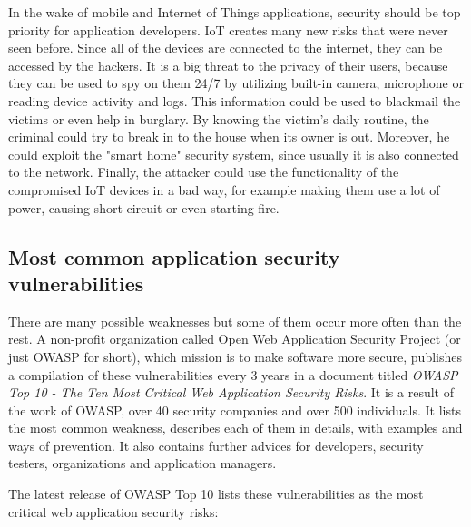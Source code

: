 \documentclass[a4paper]{article}
\begin{document}
In the wake of mobile and Internet of Things applications, security should be
top priority for application developers. IoT creates many new risks that were
never seen before. Since all of the devices are connected to the internet, they
can be accessed by the hackers. It is a big threat to the privacy of their
users, because they can be used to spy on them 24/7 by utilizing built-in
camera, microphone or reading device activity and logs. This information could
be used to blackmail the victims or even help in burglary. By knowing the
victim's daily routine, the criminal could try to break in to the house when its
owner is out. Moreover, he could exploit the "smart home" security system, since
usually it is also connected to the network. Finally, the attacker could use the
functionality of the compromised IoT devices in a bad way, for example making
them use a lot of power, causing short circuit or even starting fire.

\newpage

\subsection{Most common application security vulnerabilities}

There are many possible weaknesses but some of them occur more often than the
rest. A non-profit organization called Open Web Application Security Project
(or just OWASP for short), which mission is to make software more secure,
publishes a compilation of these vulnerabilities every 3 years in a document
titled \textit{OWASP Top 10 - The Ten Most Critical Web Application Security
Risks}. It is a result of the work of OWASP, over 40 security companies and over
500 individuals. It lists the most common weakness, describes each of them in
details, with examples and ways of prevention. It also contains further advices
for developers, security testers, organizations and application managers.

The latest release of OWASP Top 10 lists these vulnerabilities as the most
critical web application security risks:
\end{document}
